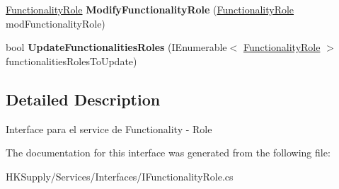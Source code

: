 \begin{DoxyCompactItemize}
\hyperlink{class_h_k_supply_1_1_models_1_1_functionality_role}{Functionality\+Role} {\bfseries Modify\+Functionality\+Role} (\hyperlink{class_h_k_supply_1_1_models_1_1_functionality_role}{Functionality\+Role} mod\+Functionality\+Role)
\item 
\mbox{\label{interface_h_k_supply_1_1_services_1_1_interfaces_1_1_i_functionality_role_a816ae3d8bb97d20aa19d3608d96528e5}} 
bool {\bfseries Update\+Functionalities\+Roles} (I\+Enumerable$<$ \hyperlink{class_h_k_supply_1_1_models_1_1_functionality_role}{Functionality\+Role} $>$ functionalities\+Roles\+To\+Update)
\end{DoxyCompactItemize}


\subsection{Detailed Description}
Interface para el service de Functionality -\/ Role 



The documentation for this interface was generated from the following file\+:\begin{DoxyCompactItemize}
\item 
H\+K\+Supply/\+Services/\+Interfaces/I\+Functionality\+Role.\+cs\end{DoxyCompactItemize}
